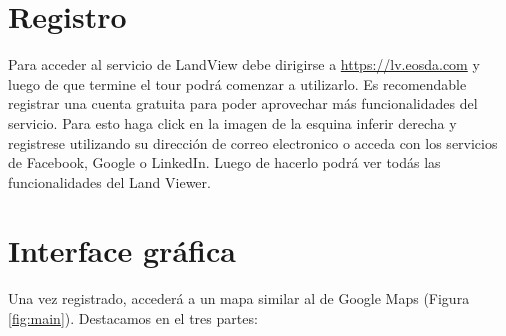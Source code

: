 \documentclass[a4paper,12pt]{book}
\begin{document}
\section{Registro}
Para acceder al servicio de LandView debe dirigirse a \url{https://lv.eosda.com} y luego de que termine el tour podrá comenzar a utilizarlo. Es recomendable registrar una cuenta gratuita para poder aprovechar más funcionalidades del servicio. Para esto haga click en la imagen de la esquina inferir derecha y registrese utilizando su dirección de correo electronico o acceda con los servicios de Facebook, Google o LinkedIn. Luego de hacerlo podrá ver todás las funcionalidades del Land Viewer.

\section{Interface gráfica}

Una vez registrado, accederá a un mapa  similar al de Google Maps (Figura \ref{fig:main}). Destacamos en el tres partes:
\end{document}
